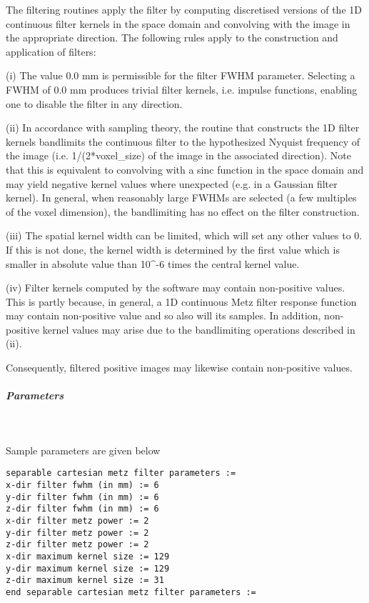 \documentclass{article}
\newcommand{\subsubsubsubsection}[1]{\subparagraph{#1} \mbox{} \\}
\begin{document}
{{The filtering routines apply the filter by computing discretised 
versions of the 1D continuous filter kernels in the space domain 
and convolving with the image in the appropriate direction. The 
following rules apply to the construction and application of 
filters:



(i) The value 0.0 mm is permissible for the filter FWHM parameter. 
Selecting a FWHM of 0.0 mm produces trivial filter kernels, i.e. 
impulse functions, enabling one to disable the filter in any 
direction. 



(ii) In accordance with sampling theory, the routine that constructs 
the 1D filter kernels bandlimits the continuous filter to the 
hypothesized Nyquist frequency of the image (i.e. 1/(2*voxel\_size) 
of the image in the associated direction). Note that this is 
equivalent to convolving with a sinc function in the space domain 
and may yield negative kernel values where unexpected (e.g. in 
a Gaussian filter kernel). In general, when reasonably large 
FWHMs are selected (a few multiples of the voxel dimension), 
the bandlimiting has no effect on the filter construction.



(iii) The spatial kernel width can be limited, which will set 
any other values to 0. If this is not done, the kernel width 
is determined by the first value which is smaller in absolute 
value than 10{\textasciicircum}-6 times the central kernel value.



(iv) Filter kernels computed by the software may contain non-positive 
values. This is partly because, in general, a 1D continuous Metz 
filter response function may contain non-positive value and so 
also will its samples. In addition, non-positive kernel values 
may arise due to the bandlimiting operations described in (ii). 



Consequently, filtered positive images may likewise contain non-positive 
values. 

{ \subsubsubsubsection{Parameters}
}
Sample parameters are given below
\begin{verbatim}
separable cartesian metz filter parameters :=
x-dir filter fwhm (in mm) := 6
y-dir filter fwhm (in mm) := 6
z-dir filter fwhm (in mm) := 6
x-dir filter metz power := 2
y-dir filter metz power := 2
z-dir filter metz power := 2
x-dir maximum kernel size := 129
y-dir maximum kernel size := 129
z-dir maximum kernel size := 31
end separable cartesian metz filter parameters := 
\end{verbatim}


}}
\end{document}
